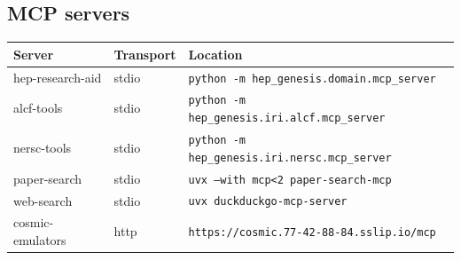 \documentclass[11pt,a4paper]{article}
\begin{document}
\subsection{MCP servers}
\begin{longtable}{@{}p{}p{}p{}@{}}
\toprule Server & Transport & Location \\ \midrule \endhead
hep-research-aid & stdio & \texttt{python -m hep\_\allowbreak{}genesis.domain.mcp\_\allowbreak{}server} \\
alcf-tools & stdio & \texttt{python -m hep\_\allowbreak{}genesis.iri.alcf.mcp\_\allowbreak{}server} \\
nersc-tools & stdio & \texttt{python -m hep\_\allowbreak{}genesis.iri.nersc.mcp\_\allowbreak{}server} \\
paper-search & stdio & \texttt{uvx --with mcp\textless{}\allowbreak{}2 paper-search-mcp} \\
web-search & stdio & \texttt{uvx duckduckgo-mcp-server} \\
cosmic-emulators & http & \texttt{https:\allowbreak{}/\allowbreak{}/\allowbreak{}cosmic.77-42-88-84.sslip.io/\allowbreak{}mcp} \\
\bottomrule\end{longtable}
\end{document}
